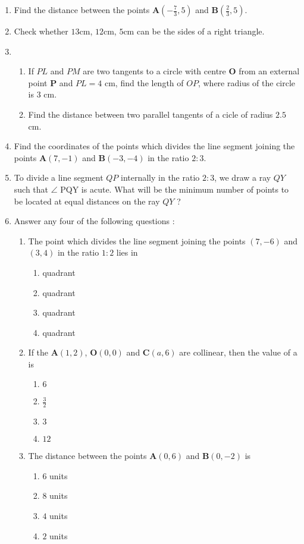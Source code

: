 \documentclass{article}
\let\vec\mathbf
\newcommand{\romanNumeral}[1]{\uppercase\expandafter{\romannumeral#1}}
\begin{document}
\begin{enumerate}
	\item Find the distance between the points $\vec{A}(-\frac{7}{3},5)$ and $\vec{B}(\frac{2}{3},5)$.                  	\item Check whether $13$cm, $12$cm, $5$cm can be the sides of a right triangle.
	\item \begin{enumerate}[label=(\alph*)]
			\item If $PL$ and $PM$ are two tangents to a circle with centre $\vec{O}$ from an external point $\vec{P}$ and $PL=4$ cm, find the length of $OP$, where radius of the circle is 3 cm.
		\item Find the distance between two parallel tangents of a cicle of radius $2.5$ cm.
             \end{enumerate}
     \item Find the coordinates of the points which divides the line segment joining the points $\vec{A}(7,-1)$ and $\vec{B}(-3,-4)$ in the ratio $2:3$.	

     \item To divide a line segment $QP$ internally in the ratio $2:3$, we draw a ray $QY$ such that $\angle$ PQY is acute. What will be  the minimum number of points to be located at equal distances on the ray $QY$ ?

     \item Answer any four of the following questions :
	     \begin{enumerate}[label=(\roman*)]
		     \item The point which divides the line segment joining the points $(7,-6)$ and $(3,4)$ in the ratio $1:2$ lies in
			     \begin{enumerate}[label=(\Alph*)]
                              \item \romanNumeral{1} quadrant
			      \item \romanNumeral{2} quadrant
			      \item \romanNumeral{3} quadrant
			      \item \romanNumeral{4} quadrant
			     \end{enumerate}
		     \item If the $\vec{A}(1, 2)$, $\vec{O}(0, 0)$ and $\vec{C}(a, 6)$ are collinear, then the value of a is
			     \begin{enumerate}[label=(\Alph*)]
				     \item $6$
				     \item $\frac{3}{2}$
				     \item $3$
				     \item $12$
			     \end{enumerate}
		    \item The distance between the points $\vec{A}(0, 6)$ and $\vec{B}(0, -2)$ is 
			    \begin{enumerate}[label=(\Alph*)]
				    \item $6$ units
				    \item $8$ units
				    \item $4$ units
				    \item $2$ units
	

\end{enumerate}
\end{enumerate}
\end{enumerate}
\end{document}
